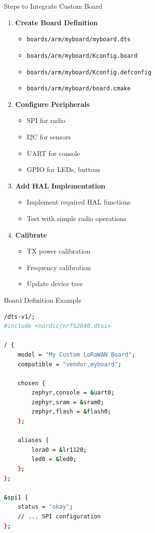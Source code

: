 \documentclass{beamer}
\begin{document}
\begin{frame}{Steps to Integrate Custom Board}
\begin{enumerate}
    \item \textbf{Create Board Definition}
    \begin{itemize}
        \item \texttt{boards/arm/myboard/myboard.dts}
        \item \texttt{boards/arm/myboard/Kconfig.board}
        \item \texttt{boards/arm/myboard/Kconfig.defconfig}
        \item \texttt{boards/arm/myboard/board.cmake}
    \end{itemize}

    \item \textbf{Configure Peripherals}
    \begin{itemize}
        \item SPI for radio
        \item I2C for sensors
        \item UART for console
        \item GPIO for LEDs, buttons
    \end{itemize}

    \item \textbf{Add HAL Implementation}
    \begin{itemize}
        \item Implement required HAL functions
        \item Test with simple radio operations
    \end{itemize}

    \item \textbf{Calibrate}
    \begin{itemize}
        \item TX power calibration
        \item Frequency calibration
        \item Update device tree
    \end{itemize}
\end{enumerate}
\end{frame}

\begin{frame}[fragile]{Board Definition Example}
\begin{lstlisting}[language=bash, caption={myboard.dts}]
/dts-v1/;
#include <nordic/nrf52840.dtsi>

/ {
    model = "My Custom LoRaWAN Board";
    compatible = "vendor,myboard";

    chosen {
        zephyr,console = &uart0;
        zephyr,sram = &sram0;
        zephyr,flash = &flash0;
    };

    aliases {
        lora0 = &lr1120;
        led0 = &led0;
    };
};

&spi1 {
    status = "okay";
    // ... SPI configuration
};
\end{lstlisting}
\end{frame}
\end{document}
